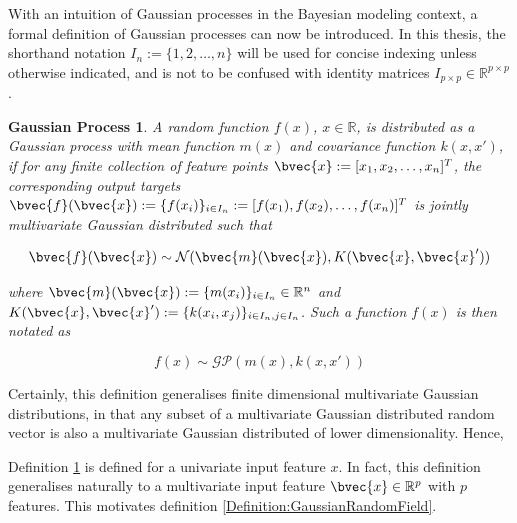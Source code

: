 			With an intuition of Gaussian processes in the Bayesian modeling context, a formal definition of Gaussian processes can now be introduced. In this thesis, the shorthand notation $I_{n} := \{1, 2, \dots, n\}$ will be used for concise indexing unless otherwise indicated, and is not to be confused with identity matrices $I_{p \times p} \in \mathbb{R}^{p \times p}$.
			
			\newtheorem{gpdef}{Gaussian Process}[section]
			\begin{gpdef}
				A random function $f(x)$, $x \in \mathbb{R}$, is distributed as a Gaussian process with mean function $m(x)$ and covariance function $k(x, x')$, if for any finite collection of feature points $\bvec{x} := [x_{1}, x_{2}, \dots, x_{n}]^{T}$, the corresponding output targets $\bvec{f}(\bvec{x}) := \{f(x_{i})\}_{i \in I_{n}} := [f(x_{1}), f(x_{2}), \dots, f(x_{n})]^{T}$ is jointly multivariate Gaussian distributed such that 

					\begin{equation}
						\bvec{f}(\bvec{x}) \sim \mathcal{N}(\bvec{m}(\bvec{x}), K(\bvec{x}, \bvec{x}'))
					\label{Equation:GaussianProcessFiniteDistribution}
					\end{equation}	
				
				where $\bvec{m}(\bvec{x}) :=  \{m(x_{i})\}_{i \in I_{n}} \in \mathbb{R}^{n}$ and $K(\bvec{x}, \bvec{x}') := \{k(x_{i}, x_{j})\}_{i \in I_{n}, j \in I_{n}}$. Such a function $f(x)$ is then notated as
				
					\begin{equation}
						f(x) \sim \mathcal{GP}(m(x), k(x, x'))
					\label{Equation:GaussianProcess}
					\end{equation}	
					
			\label{Definition:GaussianProcess}
			\end{gpdef}
			
			Certainly, this definition generalises finite dimensional multivariate Gaussian distributions, in that any subset of a multivariate Gaussian distributed random vector is also a multivariate Gaussian distributed of lower dimensionality. Hence, 

			Definition \ref{Definition:GaussianProcess} is defined for a univariate input feature $x$. In fact, this definition generalises naturally to a multivariate input feature $\bvec{x} \in \mathbb{R}^{p}$ with $p$ features. This motivates definition \ref{Definition:GaussianRandomField}.
			
